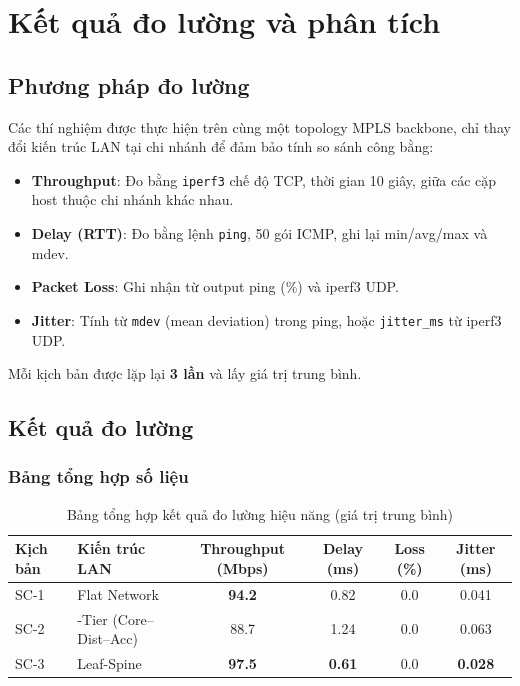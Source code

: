 \chapter{Kết quả đo lường và phân tích}

\section{Phương pháp đo lường}

Các thí nghiệm được thực hiện trên cùng một topology MPLS backbone, chỉ thay đổi kiến trúc LAN tại chi nhánh để đảm bảo tính so sánh công bằng:

\begin{itemize}
    \item \textbf{Throughput}: Đo bằng \texttt{iperf3} chế độ TCP, thời gian 10 giây, giữa các cặp host thuộc chi nhánh khác nhau.
    \item \textbf{Delay (RTT)}: Đo bằng lệnh \texttt{ping}, 50 gói ICMP, ghi lại min/avg/max và mdev.
    \item \textbf{Packet Loss}: Ghi nhận từ output ping (\%) và iperf3 UDP.
    \item \textbf{Jitter}: Tính từ \texttt{mdev} (mean deviation) trong ping, hoặc \texttt{jitter\_ms} từ iperf3 UDP.
\end{itemize}

Mỗi kịch bản được lặp lại \textbf{3 lần} và lấy giá trị trung bình.

\section{Kết quả đo lường}

\subsection{Bảng tổng hợp số liệu}

\begin{table}[htbp]
    \centering
    \caption{Bảng tổng hợp kết quả đo lường hiệu năng (giá trị trung bình)}
    \vspace{0.2cm}
    \small
    \begin{tabularx}{\textwidth}{|>{\raggedright\arraybackslash}p{1.2cm}|>{\raggedright\arraybackslash}p{2.5cm}|c|c|c|c|}
        \hline
        \textbf{Kịch bản} & \textbf{Kiến trúc LAN} & \textbf{Throughput (Mbps)} & \textbf{Delay (ms)} & \textbf{Loss (\%)} & \textbf{Jitter (ms)} \\ \hline
        SC-1 & Flat Network & \textbf{94.2} & 0.82 & 0.0 & 0.041 \\ \hline
        SC-2 & 3-Tier (Core–Dist–Acc) & 88.7 & 1.24 & 0.0 & 0.063 \\ \hline
        SC-3 & Leaf-Spine & \textbf{97.5} & \textbf{0.61} & 0.0 & \textbf{0.028} \\ \hline
    \end{tabularx}
\end{table}

